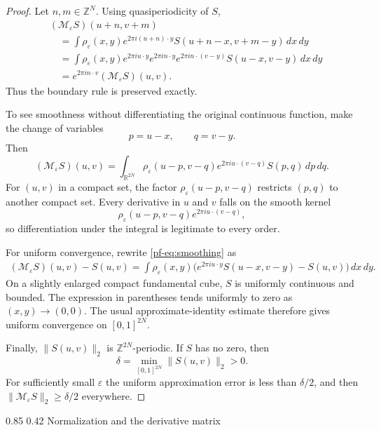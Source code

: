 \documentclass[11pt,reqno]{amsart}
\makeatletter
\numberwithin{equation}{section}
\renewcommand\subsection{\@startsection{subsection}{2}{\z@}%
  {0.85\baselineskip \@plus 0.25\baselineskip \@minus 0.10\baselineskip}%
  {0.42\baselineskip}%
  {\normalfont\bfseries}}
\theoremstyle{definition}
\theoremstyle{remark}
\newcommand{\R}{\mathbb R}
\newcommand{\Z}{\mathbb Z}
\newcommand{\norm}[1]{\lVert #1\rVert}
\makeatother
\begin{document}
\begin{proof}
Let $n,m\in\Z^N$.  Using quasiperiodicity of $S$,
\begin{align*}
 &(\mathcal M_\varepsilon S)(u+n,v+m)\\
 &\quad=\int \rho_\varepsilon(x,y)
 e^{2\pi i(u+n)\cdot y}
 S(u+n-x,v+m-y)\,dx\,dy\\
 &\quad=\int \rho_\varepsilon(x,y)
 e^{2\pi i u\cdot y}e^{2\pi i n\cdot y}
 e^{2\pi i n\cdot(v-y)}S(u-x,v-y)\,dx\,dy\\
 &\quad=e^{2\pi i n\cdot v}
 (\mathcal M_\varepsilon S)(u,v).
\end{align*}
Thus the boundary rule is preserved exactly.

To see smoothness without differentiating the original continuous function,
make the change of variables
\[
 p=u-x,\qquad q=v-y.
\]
Then
\begin{equation}\label{pf-eq:smoothing-kernel}
 (\mathcal M_\varepsilon S)(u,v)
 =\int_{\R^{2N}}
 \rho_\varepsilon(u-p,v-q)
 e^{2\pi i u\cdot(v-q)}S(p,q)\,dp\,dq.
\end{equation}
For $(u,v)$ in a compact set, the factor
$\rho_\varepsilon(u-p,v-q)$ restricts $(p,q)$ to another compact set.
Every derivative in $u$ and $v$ falls on the smooth kernel
\[
 \rho_\varepsilon(u-p,v-q)e^{2\pi i u\cdot(v-q)},
\]
so differentiation under the integral is legitimate to every order.

For uniform convergence, rewrite \eqref{pf-eq:smoothing} as
\begin{align*}
 (\mathcal M_\varepsilon S)(u,v)-S(u,v)
  =\int \rho_\varepsilon(x,y)
  \bigl(e^{2\pi i u\cdot y}S(u-x,v-y)-S(u,v)\bigr)\,dx\,dy.
\end{align*}
On a slightly enlarged compact fundamental cube, $S$ is uniformly
continuous and bounded.  The expression in parentheses tends uniformly to
zero as $(x,y)\to(0,0)$.  The usual approximate-identity estimate therefore
gives uniform convergence on $[0,1]^{2N}$.

Finally, $\norm{S(u,v)}_2$ is $\Z^{2N}$-periodic.  If $S$ has no zero, then
\[
 \delta=\min_{[0,1]^{2N}}\norm{S(u,v)}_2>0.
\]
For sufficiently small $\varepsilon$ the uniform approximation error is
less than $\delta/2$, and then
$\norm{\mathcal M_\varepsilon S}_2\ge\delta/2$ everywhere.
\end{proof}

\subsection{Normalization and the derivative matrix}\label{pf-sec:normalize}
\end{document}
